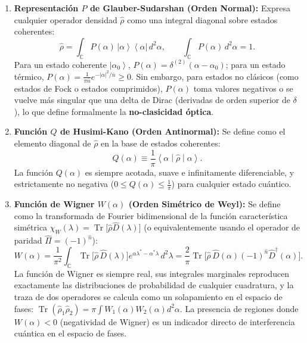 \documentclass[11pt,a4paper,twoside]{report}
\theoremstyle{definition}
\theoremstyle{plain}
\theoremstyle{remark}
\newcommand{\ket}[1]{\left| #1 \right\rangle}
\newcommand{\ketbra}[2]{\left| #1 \right\rangle\!\left\langle #2 \right|}
\newcommand{\mel}[3]{\left\langle #1 \middle| #2 \middle| #3 \right\rangle}
\newcommand{\tr}{\operatorname{Tr}}
\newcommand{\op}[1]{\hat{#1}}
\begin{document}
\begin{enumerate}[label=\textbf{\arabic*.}]
    \item \textbf{Representación $P$ de Glauber-Sudarshan (Orden Normal):} Expresa cualquier operador densidad $\op{\rho}$ como una integral diagonal sobre estados coherentes:
    \begin{equation}
        \op{\rho} = \int_{\mathbb{C}} P(\alpha)\, \ketbra{\alpha}{\alpha}\, d^2\alpha, \qquad \int_{\mathbb{C}} P(\alpha)\,d^2\alpha = 1.
    \end{equation}
    Para un estado coherente $\ket{\alpha_0}$, $P(\alpha) = \delta^{(2)}(\alpha - \alpha_0)$; para un estado térmico, $P(\alpha) = \frac{1}{\pi\bar{n}}e^{-|\alpha|^2/\bar{n}} \ge 0$. Sin embargo, para estados no clásicos (como estados de Fock o estados comprimidos), $P(\alpha)$ toma valores negativos o se vuelve más singular que una delta de Dirac (derivadas de orden superior de $\delta$), lo que define formalmente la \textbf{no-clasicidad óptica}.

    \item \textbf{Función $Q$ de Husimi-Kano (Orden Antinormal):} Se define como el elemento diagonal de $\op{\rho}$ en la base de estados coherentes:
    \begin{equation}
        Q(\alpha) \equiv \frac{1}{\pi}\mel{\alpha}{\op{\rho}}{\alpha}.
    \end{equation}
    La función $Q(\alpha)$ es siempre acotada, suave e infinitamente diferenciable, y estrictamente no negativa ($0 \le Q(\alpha) \le \frac{1}{\pi}$) para cualquier estado cuántico.

    \item \textbf{Función de Wigner $W(\alpha)$ (Orden Simétrico de Weyl):} Se define como la transformada de Fourier bidimensional de la función característica simétrica $\chi_W(\lambda) = \tr\big[\op{\rho}\op{D}(\lambda)\big]$ (o equivalentemente usando el operador de paridad $\op{\Pi} = (-1)^{\op{n}}$):
    \begin{equation}
        W(\alpha) = \frac{1}{\pi^2}\int_{\mathbb{C}} \tr\big[\op{\rho}\,\op{D}(\lambda)\big] e^{\alpha\lambda^* - \alpha^*\lambda}\,d^2\lambda = \frac{2}{\pi}\tr\Big[ \op{\rho}\,\op{D}(\alpha)(-1)^{\op{n}}\op{D}^\dagger(\alpha) \Big].
    \end{equation}
    La función de Wigner es siempre real, sus integrales marginales reproducen exactamente las distribuciones de probabilidad de cualquier cuadratura, y la traza de dos operadores se calcula como un solapamiento en el espacio de fases: $\tr(\op{\rho}_1\op{\rho}_2) = \pi\int W_1(\alpha)W_2(\alpha)d^2\alpha$. La presencia de regiones donde $W(\alpha) < 0$ (negatividad de Wigner) es un indicador directo de interferencia cuántica en el espacio de fases.
\end{enumerate}
\end{document}
